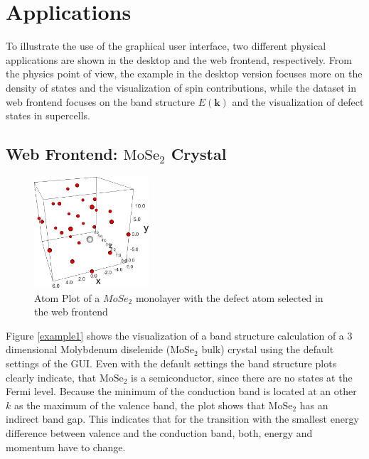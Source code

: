 \chapter{Applications}
\label{chap:applications}


To illustrate the use of the graphical user interface, two different physical
applications are shown in the desktop and the web frontend, respectively. From
the physics point of view, the example in the desktop version focuses more on the
density of states and the visualization of spin contributions, while the dataset
in web frontend focuses on the band structure $E(\mathbf{k})$ and the visualization
of defect states in supercells.

\section{Web Frontend: $\textrm{MoSe}_2$ Crystal}

\begin{figure} %
    \centering
    \includegraphics[width=0.38\textwidth]{christian/screen4_atomplot_defect.png}
    \caption[Atom Plot of a $\textrm{MoSe}_2$ monolayer]{Atom Plot of a $MoSe_2$ monolayer with the defect atom selected in
      the web frontend}
    \label{fig:modules}
\end{figure}

Figure \ref{example1} shows the visualization of a band structure calculation of a 3 dimensional Molybdenum diselenide ($\textrm{MoSe}_2$ bulk) crystal using the default settings of the GUI. Even with the default settings the band structure plots clearly indicate, that $\textrm{MoSe}_2$ is a semiconductor, since there are no states at the Fermi level. Because the minimum of the conduction band is located at an other $k$ as the maximum of the valence band, the plot shows that $\textrm{MoSe}_2$ has an indirect band gap. This indicates that for the transition with the smallest energy difference between valence and the conduction band, both, energy and momentum have to change.

